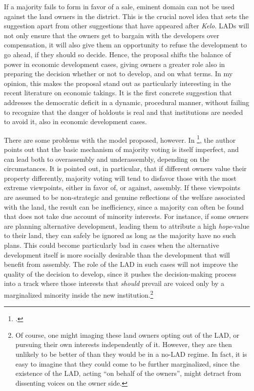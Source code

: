 If a majority fails to form in favor of a sale, eminent domain can not be used against the land owners in the district. This is the crucial novel idea that sets the suggestion apart from other suggestions that have appeared after {\it Kelo}. LADs will not only ensure that the owners get to bargain with the developers over compensation, it will also give them an opportunity to refuse the development to go ahead, if they should so decide. Hence, the proposal shifts the balance of power in economic development cases, giving owners a greater role also in preparing the decision whether or not to develop, and on what terms. In my opinion, this makes the proposal stand out as particularly interesting in the recent literature on economic takings. It is the first concrete suggestion that addresses the democratic deficit in a dynamic, procedural manner, without failing to recognize that the danger of holdouts is real and that institutions are needed to avoid it, also in economic development cases.

There are some problems with the model proposed, however. In \footcite{ladres09}, the author points out that the basic mechanism of majority voting is itself imperfect, and can lead both to overassembly and underassembly, depending on the circumstances. It is pointed out, in particular, that if different owners value their property differently, majority voting will tend to disfavor those with the most extreme viewpoints, either in favor of, or against, assembly. If these viewpoints are assumed to be non-strategic and genuine reflections of the welfare associated with the land, the result can be inefficiency, since a majority can often be found that does not take due account of minority interests. For instance, if some owners are planning alternative development, leading them to attribute a high {\it hope}-value to their land, they can safely be ignored as long as the majority have no such plans. This could become particularly bad in cases when the alternative development itself is more socially desirable than the development that will benefit from assembly. The role of the LAD in such cases will not improve the quality of the decision to develop, since it pushes the decision-making process into a track where those interests that {\it should} prevail are voiced only by a marginalized minority inside the new institution.\footnote{Of course, one might imaging these land owners opting out of the LAD, or pursuing their own interests independently of it. However, they are then unlikely to be better of than they would be in a no-LAD regime. In fact, it is easy to imagine that they could come to be further marginalized, since the existence of the LAD, acting ``on behalf of the owners'', might detract from dissenting voices on the owner side.}

